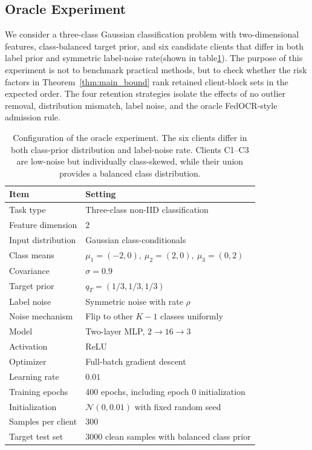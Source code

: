 ﻿\documentclass[conference]{IEEEtran}
\theoremstyle{definition}
\theoremstyle{remark}
\begin{document}
\subsection{Oracle Experiment}
\label{subsec:oracle_exp}
We consider a three-class Gaussian classification problem with two-dimensional features, class-balanced target prior, and six candidate clients that differ in both label prior and symmetric label-noise rate(shown in table\ref{tab:oracle_setup}).
The purpose of this experiment is not to benchmark practical methods, but to check whether the risk factors in Theorem~\ref{thm:main_bound} rank retained client-block sets in the expected order.
The four retention strategies isolate the effects of no outlier removal, distribution mismatch, label noise, and the oracle FedOCR-style admission rule.
\begin{table}[t]
	\centering
    \caption{\normalfont Configuration of the oracle experiment. The six clients differ in both class-prior distribution and label-noise rate. Clients C1--C3 are low-noise but individually class-skewed, while their union provides a balanced class distribution.}
	\label{tab:oracle_setup}
	\setlength{\tabcolsep}{4pt}
	\renewcommand{\arraystretch}{1.15}
	\begin{tabular}{l|l}
		\toprule
		\textbf{Item} & \textbf{Setting} \\
		\midrule
		Task type & Three-class non-IID classification \\
		Feature dimension & 2 \\
		Input distribution & Gaussian class-conditionals \\
		Class means & $\mu_1=(-2,0),\ \mu_2=(2,0),\ \mu_3=(0,2)$ \\
		Covariance & $\sigma=0.9$ \\
		Target prior & $q_T=(1/3,1/3,1/3)$ \\
		Label noise & Symmetric noise with rate $\rho$ \\
		Noise mechanism & Flip to other $K-1$ classes uniformly \\
		Model & Two-layer MLP, $2 \rightarrow 16 \rightarrow 3$ \\
		Activation & ReLU \\
		Optimizer & Full-batch gradient descent \\
		Learning rate & $0.01$ \\
		Training epochs & 400 epochs, including epoch 0 initialization \\
		Initialization & $\mathcal{N}(0,0.01)$ with fixed random seed \\
		Samples per client & 300 \\
		Target test set & 3000 clean samples with balanced class prior \\
		\bottomrule
	\end{tabular}
\end{table}
\end{document}
